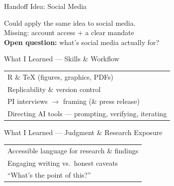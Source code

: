 \documentclass[10pt,aspectratio=169]{beamer}
\begin{document}
\begin{frame}{Handoff Idea: Social Media}
  \begin{center}
    \Large
    Could apply the same idea to social media.\\[14pt]
    \large Missing: account access + a clear mandate\\[10pt]
    \textbf{Open question:} what's social media actually for?
  \end{center}
\end{frame}

\begin{frame}{What I Learned --- Skills \& Workflow}
  \begin{center}
  \Large
  \begin{tabular}{@{}l@{}}
    R \& \TeX{} (figures, graphics, PDFs) \\[10pt]
    Replicability \& version control \\[10pt]
    PI interviews $\rightarrow$ framing (\& press release) \\[10pt]
    Directing AI tools --- prompting, verifying, iterating
  \end{tabular}
  \end{center}
\end{frame}

\begin{frame}{What I Learned --- Judgment \& Research Exposure}
  \begin{center}
  \Large
  \begin{tabular}{@{}l@{}}
    Accessible language for research \& findings \\[10pt]
    Engaging writing vs.\ honest caveats \\[10pt]
    ``What's the point of this?''
  \end{tabular}
  \end{center}
\end{frame}
\end{document}
